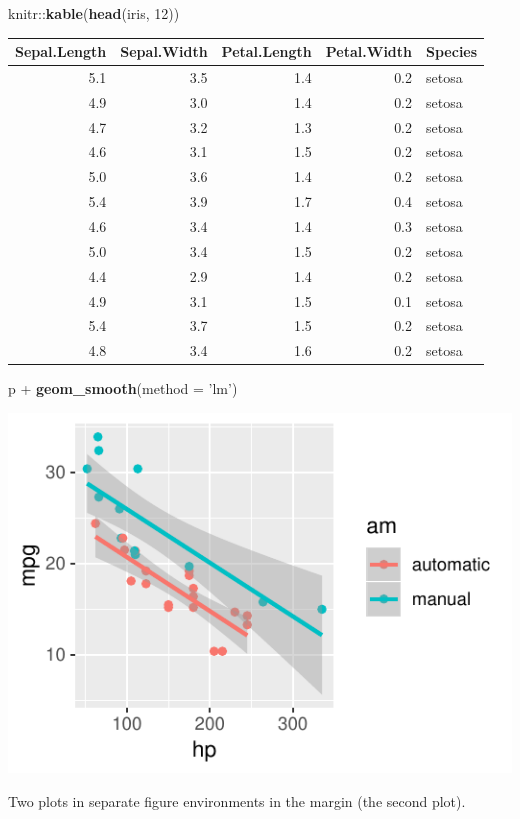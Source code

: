 \documentclass[]{tufte-handout}
\newenvironment{Shaded}{}{}
\newcommand{\KeywordTok}[1]{\textcolor[rgb]{0.00,0.44,0.13}{\textbf{#1}}}
\newcommand{\DataTypeTok}[1]{\textcolor[rgb]{0.56,0.13,0.00}{#1}}
\newcommand{\DecValTok}[1]{\textcolor[rgb]{0.25,0.63,0.44}{#1}}
\newcommand{\StringTok}[1]{\textcolor[rgb]{0.25,0.44,0.63}{#1}}
\newcommand{\OperatorTok}[1]{\textcolor[rgb]{0.40,0.40,0.40}{#1}}
\newcommand{\NormalTok}[1]{#1}
\begin{document}
\begin{Shaded}
\begin{Highlighting}[]
\NormalTok{knitr}\OperatorTok{::}\KeywordTok{kable}\NormalTok{(}\KeywordTok{head}\NormalTok{(iris, }\DecValTok{12}\NormalTok{))}
\end{Highlighting}
\end{Shaded}

\begin{longtable}[]{@{}rrrrl@{}}
\toprule
Sepal.Length & Sepal.Width & Petal.Length & Petal.Width &
Species\tabularnewline
\midrule
\endhead
5.1 & 3.5 & 1.4 & 0.2 & setosa\tabularnewline
4.9 & 3.0 & 1.4 & 0.2 & setosa\tabularnewline
4.7 & 3.2 & 1.3 & 0.2 & setosa\tabularnewline
4.6 & 3.1 & 1.5 & 0.2 & setosa\tabularnewline
5.0 & 3.6 & 1.4 & 0.2 & setosa\tabularnewline
5.4 & 3.9 & 1.7 & 0.4 & setosa\tabularnewline
4.6 & 3.4 & 1.4 & 0.3 & setosa\tabularnewline
5.0 & 3.4 & 1.5 & 0.2 & setosa\tabularnewline
4.4 & 2.9 & 1.4 & 0.2 & setosa\tabularnewline
4.9 & 3.1 & 1.5 & 0.1 & setosa\tabularnewline
5.4 & 3.7 & 1.5 & 0.2 & setosa\tabularnewline
4.8 & 3.4 & 1.6 & 0.2 & setosa\tabularnewline
\bottomrule
\end{longtable}

\begin{Shaded}
\begin{Highlighting}[]
\NormalTok{p }\OperatorTok{+}\StringTok{ }\KeywordTok{geom_smooth}\NormalTok{(}\DataTypeTok{method =} \StringTok{'lm'}\NormalTok{)}
\end{Highlighting}
\end{Shaded}

\begin{marginfigure}
\includegraphics{TufteExample_files/figure-latex/fig-margin-separate-2} \caption[Two plots in separate figure environments in the margin (the second plot)]{Two plots in separate figure environments in the margin (the second plot).}\label{fig:fig-margin-separate2}
\end{marginfigure}
\end{document}
